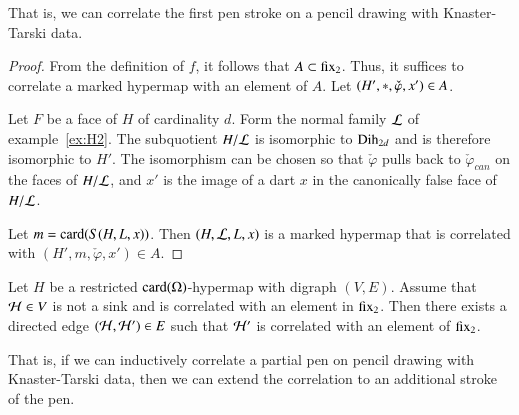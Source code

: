 That is, we can correlate the first pen stroke on a pencil drawing
with Knaster-Tarski data.

\begin{proof}  From the definition of $f$, it follows
that $A\subset {\operatorname{fix}}_2$.  Thus, it suffices to correlate a marked
hypermap with an element of $A$.  Let $(H',{*},\check\varphi,x')\in A$.

Let $F$ be a face of $H$ of cardinality $d$.  Form the normal family
${\cal L}$ of example~\ref{ex:H2}.  The subquotient $H/{\cal L}$ is
isomorphic to ${\operatorname{Dih}}_{2d}$ and is therefore isomorphic to $H'$.  The
isomorphism can be chosen so that $\check\varphi$ pulls back to
$\check\varphi_{can}$ on the faces of $H/{\cal L}$, and $x'$
is the image of a dart $x$ in the canonically false face of $H/{\cal
  L}$.

Let $m = {\operatorname{card}}(S(H,L,x))$.  Then $(H,{\cal L},L,x)$ is a marked hypermap that
is correlated with $(H',m,\check\varphi,x')\in A$.
\end{proof}

\begin{lemma}\label{lemma:correlated-edge}
  Let $H$ be a restricted ${\operatorname{card}}(\Omega)$-hypermap with digraph $(V,E)$. 
  Assume that ${\cal H}\in V$ is not a
  sink and is correlated with an element in ${\operatorname{fix}}_2$.
  Then there exists a directed edge  $({\cal H},{\cal H}')\in E$ such that
 $\cal H'$ is correlated with an element of  ${\operatorname{fix}}_2$.
\end{lemma}

That is, if we can inductively correlate a partial pen on pencil drawing with
Knaster-Tarski data, then we can extend the correlation to an additional stroke
of the pen.

